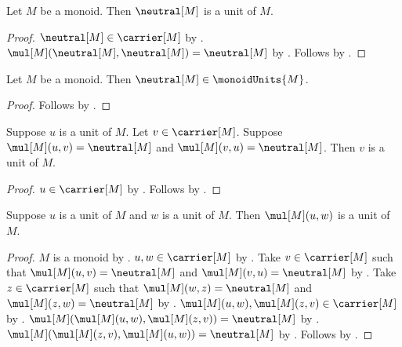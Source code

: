 \begin{proposition}\label{monoid_neutral_is_unit}
    Let $M$ be a monoid.
    Then $\neutral[M]$ is a unit of $M$.
\end{proposition}
\begin{proof}
    $\neutral[M]\in\carrier[M]$ by .
    $\mul[M](\neutral[M],\neutral[M])=\neutral[M]$ by
        .
    Follows by .
\end{proof}

\begin{corollary}\label{monoid_neutral_in_units}
    Let $M$ be a monoid.
    Then $\neutral[M]\in\monoidUnits{M}$.
\end{corollary}
\begin{proof}
    Follows by
        .
\end{proof}

\begin{theorem}\label{monoid_unit_inverse_is_unit}
    Suppose $u$ is a unit of $M$.
    Let $v\in\carrier[M]$.
    Suppose $\mul[M](u,v)=\neutral[M]$ and
        $\mul[M](v,u)=\neutral[M]$.
    Then $v$ is a unit of $M$.
\end{theorem}
\begin{proof}
    $u\in\carrier[M]$ by .
    Follows by .
\end{proof}

\begin{theorem}\label{monoid_unit_product}
    Suppose $u$ is a unit of $M$ and $w$ is a unit of $M$.
    Then $\mul[M](u,w)$ is a unit of $M$.
\end{theorem}
\begin{proof}
    $M$ is a monoid by .
    $u,w\in\carrier[M]$ by .
    Take $v\in\carrier[M]$ such that
        $\mul[M](u,v)=\neutral[M]$ and
        $\mul[M](v,u)=\neutral[M]$ by
        .
    Take $z\in\carrier[M]$ such that
        $\mul[M](w,z)=\neutral[M]$ and
        $\mul[M](z,w)=\neutral[M]$ by
        .
    $\mul[M](u,w),\mul[M](z,v)\in\carrier[M]$ by
        .
    $\mul[M](\mul[M](u,w),\mul[M](z,v))=\neutral[M]$ by
        .
    $\mul[M](\mul[M](z,v),\mul[M](u,w))=\neutral[M]$ by
        .
    Follows by .
\end{proof}

